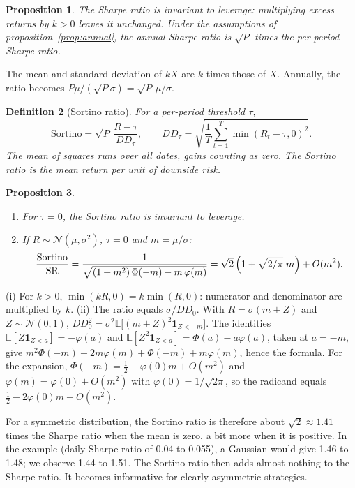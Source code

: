 \documentclass[11pt,a4paper]{article}
\makeatletter
\theoremstyle{pdef}
\newtheorem{definition}{Definition}[section]
\theoremstyle{pstate}
\newtheorem{proposition}[definition]{Proposition}
\renewenvironment{proof}[1][\proofname]{\par\pushQED{\qed}\normalfont
  \topsep6pt\trivlist\item[\hskip\labelsep{\sffamily\bfseries #1.}]\ignorespaces}
  {\popQED\endtrivlist\@endpefalse}
\newcommand{\E}{\mathbb{E}}
\newcommand{\one}{\mathbf{1}}
\newcommand{\SR}{\mathrm{SR}}
\makeatother
\begin{document}
\begin{proposition}\label{prop:srlev}
The Sharpe ratio is invariant to leverage: multiplying excess returns by $k>0$ leaves it
unchanged. Under the assumptions of proposition~\ref{prop:annual}, the annual Sharpe
ratio is $\sqrt P$ times the per-period Sharpe ratio.
\end{proposition}

\begin{proof}
The mean and standard deviation of $kX$ are $k$ times those of $X$. Annually, the ratio
becomes $P\mu/(\sqrt P\sigma)=\sqrt P\,\mu/\sigma$.
\end{proof}

\begin{definition}[Sortino ratio]
For a per-period threshold $\tau$,
\[
\mathrm{Sortino}=\sqrt P\,\frac{\overline{R-\tau}}{DD_\tau},\qquad
DD_\tau=\sqrt{\frac1T\sum_{t=1}^T\min(R_t-\tau,0)^2}.
\]
The mean of squares runs over \emph{all} dates, gains counting as zero. The Sortino
ratio is the mean return per unit of downside risk.
\end{definition}

\begin{proposition}\label{prop:sortino}
\begin{enumerate}[label=(\roman*)]
\item For $\tau=0$, the Sortino ratio is invariant to leverage.
\item If $R\sim\mathcal N(\mu,\sigma^2)$, $\tau=0$ and $m=\mu/\sigma$:
\[
\frac{\mathrm{Sortino}}{\SR}=\frac{1}{\sqrt{(1+m^2)\,\Phi(-m)-m\,\varphi(m)}}
=\sqrt2\,\Bigl(1+\sqrt{2/\pi}\;m\Bigr)+O(m^2).
\]
\end{enumerate}
\end{proposition}

\begin{proof}
(i) For $k>0$, $\min(kR,0)=k\min(R,0)$: numerator and denominator are multiplied by $k$.
(ii) The ratio equals $\sigma/DD_0$. With $R=\sigma(m+Z)$ and $Z\sim\mathcal N(0,1)$,
$DD_0^2=\sigma^2\E\bigl[(m+Z)^2\one_{Z<-m}\bigr]$. The identities
$\E[Z\one_{Z<a}]=-\varphi(a)$ and $\E[Z^2\one_{Z<a}]=\Phi(a)-a\varphi(a)$, taken at $a=-m$,
give $m^2\Phi(-m)-2m\varphi(m)+\Phi(-m)+m\varphi(m)$, hence the formula. For the
expansion, $\Phi(-m)=\frac12-\varphi(0)m+O(m^2)$ and $\varphi(m)=\varphi(0)+O(m^2)$ with
$\varphi(0)=1/\sqrt{2\pi}$, so the radicand equals $\frac12-2\varphi(0)m+O(m^2)$.
\end{proof}

For a symmetric distribution, the Sortino ratio is therefore about $\sqrt2\approx1.41$
times the Sharpe ratio when the mean is zero, a bit more when it is positive. In the
example (daily Sharpe ratio of 0.04 to 0.055), a Gaussian would give 1.46 to 1.48; we
observe 1.44 to 1.51. The Sortino ratio then adds almost nothing to the Sharpe ratio. It
becomes informative for clearly asymmetric strategies.
\end{document}
